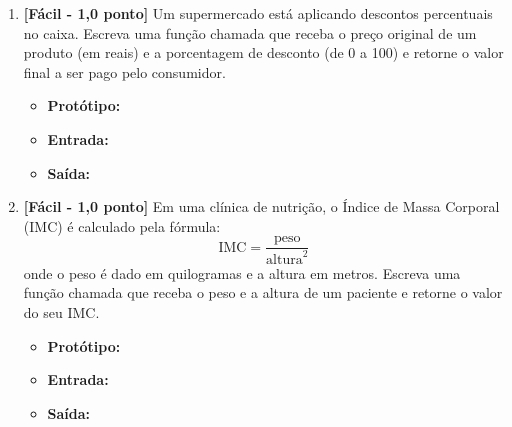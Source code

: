 \begin{enumerate}[label=\textbf{Q\arabic*.}, start=1]
\begin{itemize}[leftmargin=*]
    \item \textbf{Protótipo:}\newline {}
    \item \textbf{Entrada:} 
    \item \textbf{Saída:} 
\end{itemize}



\vspace{0.4cm}

\item \textbf{[Fácil - 1,0 ponto]} Um supermercado está aplicando descontos percentuais no caixa. Escreva uma função chamada  que receba o preço original de um produto (em reais) e a porcentagem de desconto (de 0 a 100) e retorne o valor final a ser pago pelo consumidor.

\begin{itemize}[leftmargin=*]
    \item \textbf{Protótipo:}\newline {}
    \item \textbf{Entrada:} 
    \item \textbf{Saída:} 
\end{itemize}



\vspace{0.4cm}

\item \textbf{[Fácil - 1,0 ponto]} Em uma clínica de nutrição, o Índice de Massa Corporal (IMC) é calculado pela fórmula:
\[
\text{IMC} = \frac{\text{peso}}{\text{altura}^2}
\]
onde o peso é dado em quilogramas e a altura em metros. Escreva uma função chamada  que receba o peso e a altura de um paciente e retorne o valor do seu IMC.

\begin{itemize}[leftmargin=*]
    \item \textbf{Protótipo:}\newline {}
    \item \textbf{Entrada:} 
    \item \textbf{Saída:} 
\end{itemize}


\end{enumerate}
